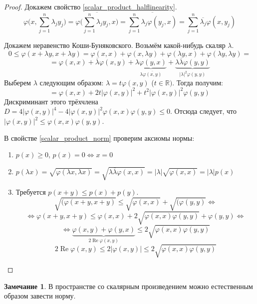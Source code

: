 \documentclass[11pt,openany,a4paper]{scrartcl}
\theoremstyle{plain}
\theoremstyle{definition}
\newtheorem{remark}[theorem]{Замечание}
\newcommand\mb{\mathbb}
\newcommand\real{\mb R}
\newcommand\ol{\overline}
\DeclareMathOperator{\Ree}{Re}
\begin{document}
\begin{proof}
    Докажем свойство \ref{scalar_product_halflinearity}.
    $$
    \varphi\bigg(x, \sum\limits_{j=1}^n \lambda_j y_j\bigg) =
    \ol{\varphi\bigg(\sum\limits_{j=1}^n \lambda_j y_j, x\bigg)} =
    \ol{\sum\limits_{j=1}^n\lambda_j \varphi(y_j, x)} =
    \sum\limits_{j=1}^n \ol{\lambda_j}\varphi(x, y_j)
    $$
    
    Докажем неравенство Коши-Буняковского. Возьмём какой-нибудь скаляр $\lambda$.
    $$
    0 \leqslant \varphi(x + \lambda y, x + \lambda y) = \varphi(x, x) +
    \varphi(x, \lambda y) + \varphi(\lambda y, x) +
    \varphi(\lambda y, \lambda y) =
    $$
    $$
    = \varphi(x, x) + \ol\lambda\varphi(x, y) +
    \underbrace{\lambda\varphi(y, x)}_{\lambda\ol{\varphi(x, y)}} +
    \underbrace{\lambda\ol\lambda\varphi(y, y)}_{|\lambda|^2\varphi(y, y)}
    $$
    Выберем $\lambda$ следующим образом:
    $\lambda = t\varphi(x, y)$ ($t \in \real)$. Тогда получим:
    $$
    = \varphi(x, x) + 2t|\varphi(x, y)|^2 + t^2|\varphi(x, y)|^2\varphi(y, y)
    $$
    Дискриминант этого трёхчлена $D = 4|\varphi(x, y)|^4 -
    4|\varphi(x, y)|^2 \varphi(x, x)\varphi(y, y) \leqslant 0$. Отсюда следует,
    что $|\varphi(x, y)|^2 \leqslant \varphi(x, x)\varphi(y, y)$.
    
    В свойстве \ref{scalar_product_norm} проверим аксиомы нормы:
    \begin{enumerate}
        \item $p(x) \geqslant 0$, $p(x) = 0 \iff x = 0$
        \item $p(\lambda x) = \sqrt{\varphi(\lambda x, \lambda x)} =
        \sqrt{\lambda\ol\lambda\varphi(x, x)} = |\lambda|\sqrt{\varphi(x, x)} =
        |\lambda|p(x)$
        \item Требуется $p(x + y) \leqslant p(x) + p(y)$.
        $$
        \sqrt{(\varphi(x + y, x + y)} \leqslant \sqrt{\varphi(x, x)} +
        \sqrt{(\varphi(y, y)} \iff
        $$
        $$
        \iff \varphi(x + y, x + y) \leqslant \varphi(x, x) +
        2\sqrt{\varphi(x, x)\varphi(y, y)} + \varphi(y, y) \iff
        $$
        $$
        \iff \underbrace{\varphi(x, y) + \varphi(y, x)}_{2\Ree\varphi(x, y)}
        \leqslant 2\sqrt{\varphi(x, x)\varphi(y, y)}
        $$
        $$
        2\Ree \varphi(x, y) \leqslant 2|\varphi(x, y)| \leqslant
        2\sqrt{\varphi(x, x) \varphi(y, y)}
        $$
    \end{enumerate}
\end{proof}
\begin{remark}
    В пространстве со скалярным произведением можно естественным образом завести 
    норму.
\end{remark}
\end{document}
